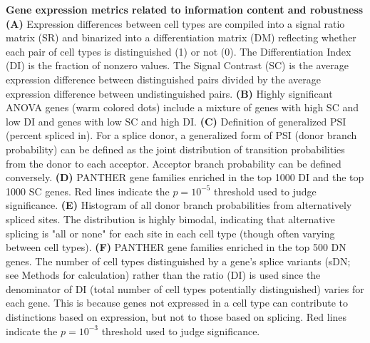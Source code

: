 \textbf{Gene expression metrics related to information content and robustness}
\textbf{(A)} Expression differences between cell types are compiled into a signal ratio matrix (SR) and binarized into a differentiation matrix (DM) reflecting whether each pair of cell types is distinguished (1) or not (0). The Differentiation Index (DI) is the fraction of nonzero values. The Signal Contrast (SC) is the average expression difference between distinguished pairs divided by the average expression difference between undistinguished pairs. 
\textbf{(B)} Highly significant ANOVA genes (warm colored dots) include a mixture of genes with high SC and low DI and genes with low SC and high DI. 
\textbf{(C)} Definition of generalized PSI (percent spliced in). For a splice donor, a generalized form of PSI (donor branch probability) can be defined as the joint distribution of transition probabilities from the donor to each acceptor. Acceptor branch probability can be defined conversely. 
\textbf{(D)} PANTHER \citep{Thomas_2003} gene families enriched in the top 1000 DI and the top 1000 SC genes. Red lines indicate the $p=10^{-5}$ threshold used to judge significance.
\textbf{(E)} Histogram of all donor branch probabilities from alternatively spliced sites. The distribution is highly bimodal, indicating that alternative splicing is "all or none" for each site in each cell type (though  often varying between cell types). 
\textbf{(F)} PANTHER gene families enriched in the top 500 DN genes. The number of cell types distinguished by a gene's splice variants (sDN; see Methods for calculation) rather than the ratio (DI) is used since the denominator of DI (total number of cell types potentially distinguished) varies for each gene. This is because genes not expressed in a cell type can contribute to distinctions based on expression, but not to those based on splicing.  Red lines indicate the $p=10^{-3}$ threshold used to judge significance.

